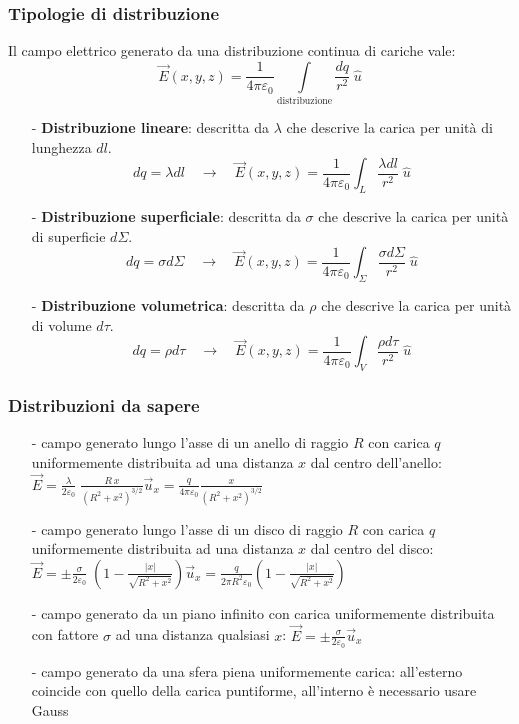 \documentclass[a4paper]{article}
\newcommand\ux{\vec{u}_x}
\begin{document}
\subsubsection*{Tipologie di distribuzione}
Il campo elettrico generato da una distribuzione continua di cariche vale:
\[\vec{E}(x,y,z) = \frac{1}{4 \pi \varepsilon_0} \int \limits_\text{distribuzione} \frac{dq}{r^2} \; \hat{u}\]
\begin{itemize}[topsep=3pt, itemsep=-7pt]
	\item[-] \textbf{Distribuzione lineare}: descritta da \(\lambda\) che descrive la carica per unità di lunghezza \(dl\).
	\[dq = \lambda dl \quad \rightarrow \quad \vec{E}(x,y,z) = \frac{1}{4 \pi \varepsilon_0} \int_L \frac{\lambda dl}{r^2} \; \hat{u}\]
	\item[-] \textbf{Distribuzione superficiale}: descritta da \(\sigma\) che descrive la carica per unità di superficie \(d\Sigma\).
	\[dq = \sigma d\Sigma \quad \rightarrow \quad \vec{E}(x,y,z) = \frac{1}{4 \pi \varepsilon_0} \int_\Sigma \frac{\sigma d\Sigma}{r^2} \; \hat{u}\]
	\item[-] \textbf{Distribuzione volumetrica}: descritta da \(\rho\) che descrive la carica per unità di volume \(d\tau\).
	\[dq = \rho d\tau \quad \rightarrow \quad \vec{E}(x,y,z) = \frac{1}{4 \pi \varepsilon_0} \int_V \frac{\rho d\tau}{r^2} \; \hat{u}\]
\end{itemize}

\subsubsection*{Distribuzioni da sapere}
\begin{itemize}[topsep=3pt, itemsep=0pt]
	\item[-] campo generato lungo l'asse di un anello di raggio \(R\) con carica \(q\) uniformemente distribuita ad una distanza
	\(x\) dal centro dell'anello: \(\displaystyle \vec{E} = \frac{\lambda}{2 \varepsilon_0} \; \frac{R \, x}{(R^2 + x^2)^{3/2}} \ux = \frac{q}{4\pi\varepsilon_0} \frac{x}{(R^2 + x^2)^{3/2}}\)
	\item[-] campo generato lungo l'asse di un disco di raggio \(R\) con carica \(q\) uniformemente distribuita ad una distanza
	\(x\) dal centro del disco: \(\displaystyle \vec{E} = \pm \frac{\sigma}{2 \varepsilon_0} \; \left(1- \frac{|x|}{\sqrt{R^2 + x^2}}\right) \ux = \frac{q}{2\pi R^2\varepsilon_0} \left(1-\frac{\left|x\right|}{\sqrt{R^2 + x^2}}\right)\)
	\item[-] campo generato da un piano infinito con carica uniformemente distribuita con fattore \(\sigma\) ad una distanza qualsiasi \(x\):
	\(\displaystyle \vec{E} = \pm \frac{\sigma}{2 \varepsilon_0}\ux\)
	\item[-] campo generato da una sfera piena uniformemente carica: all'esterno coincide con quello della carica puntiforme,
	all'interno è necessario usare Gauss
\end{itemize}
\end{document}
